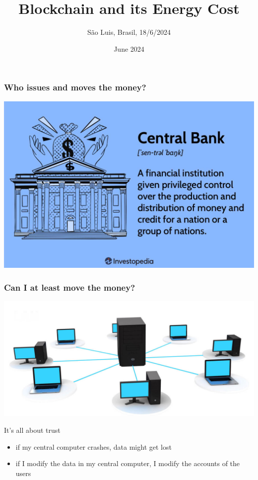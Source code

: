 \documentclass[11pt]{beamer}  %
\subtitle{S\~ao Luis, Brasil, 18/6/2024}
\title{Blockchain and its Energy Cost}
\institute{Universit\`a di Verona, Italy}
\date{June 2024}
\begin{document}
\begin{frame}
  \titlepage
\end{frame}

\begin{frame}\frametitle{Who issues and moves the money?}

  \begin{center}
    \includegraphics[scale=0.22,clip=false]{pictures/central-bank.jpg}
  \end{center}

\end{frame}

\begin{frame}\frametitle{Can I at least move the money?}

  \begin{center}
    \includegraphics[scale=0.22,clip=false]{pictures/centralized-network.jpg}
  \end{center}

  \begin{greenbox}{It's all about trust}
    \begin{itemize}
    \item if my central computer crashes, data might get lost
    \item if I modify the data in my central computer, I modify
      the accounts of the users
    \end{itemize}
  \end{greenbox}
  
\end{frame}
\end{document}
